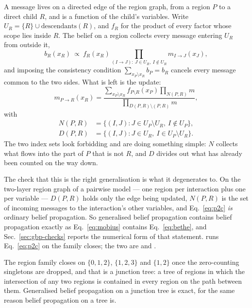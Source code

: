 A message lives on a directed edge of the region graph, from a region $P$ to a
direct child $R$, and is a function of the child's variables. Write
$U_{R}=\{R\}\cup\mathrm{descendants}(R)$, and $f_{R}$ for the product of every
factor whose scope lies inside $R$. The belief on a region collects every
message entering $U_{R}$ from outside it,
\[
  b_{R}(x_{R})\ \propto\ f_{R}(x_{R})
    \!\!\prod_{(I\to J):\ J\in U_{R},\ I\notin U_{R}}\!\! m_{I\to J}(x_{J}),
\]
and imposing the consistency condition $\sum_{x_{P}\setminus x_{R}}b_{P}=b_{R}$
cancels every message common to the two sides. What is left is the update:
\begin{equation}
  m_{P\to R}(x_{R})=
  \frac{\displaystyle\sum_{x_{P}\setminus x_{R}}f_{P\setminus R}(x_{P})
        \prod_{N(P,R)}m}
       {\displaystyle\prod_{D(P,R)\setminus(P,R)}m},
  \label{eq:p2c}
\end{equation}
with
\[
  \begin{aligned}
    N(P,R)&=\{(I,J):J\in U_{P}\setminus U_{R},\ I\notin U_{P}\},\\
    D(P,R)&=\{(I,J):J\in U_{R},\ I\in U_{P}\setminus U_{R}\}.
  \end{aligned}
\]
The two index sets look forbidding and are doing something simple: $N$ collects
what flows into the part of $P$ that is not $R$, and $D$ divides out what has
already been counted on the way down.

The check that this is the right generalisation is what it degenerates to. On
the two-layer region graph of a pairwise model --- one region per interaction
plus one per variable --- $D(P,R)$ holds only the edge being updated, $N(P,R)$
is the set of incoming messages to the interaction's other variables, and
Eq.~\eqref{eq:p2c} \emph{is} ordinary belief propagation. So generalised belief
propagation contains belief propagation exactly as Eq.~\eqref{eq:mobius}
contains Eq.~\eqref{eq:bethe}, and Sec.~\ref{sec:gbp-checks} reports the
numerical form of that statement.  runs Eq.~\eqref{eq:p2c} on the
family  closes; the two are 
and .

The region family closes on $\{0,1,2\}$, $\{1,2,3\}$ and $\{1,2\}$ once the
zero-counting singletons are dropped, and that is a junction tree: a tree of
regions in which the intersection of any two regions is contained in every
region on the path between them. Generalised belief propagation on a junction
tree is exact, for the same reason belief propagation on a tree is.

